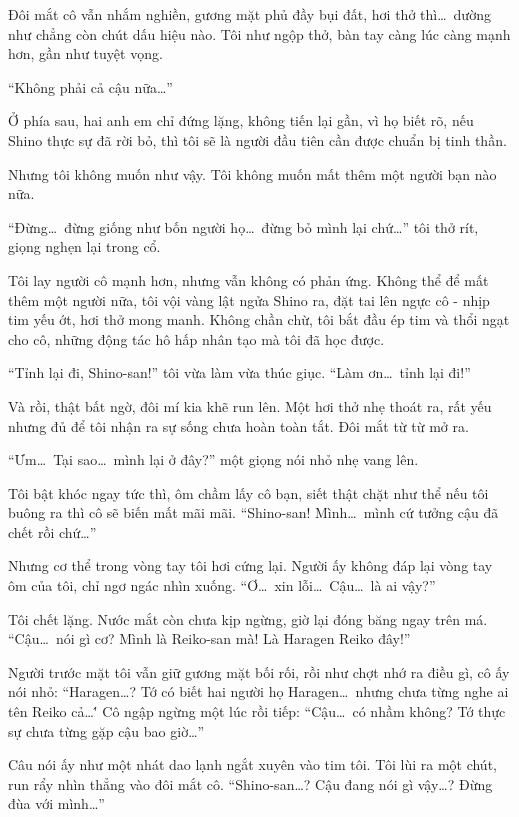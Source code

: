 \documentclass[../main.tex]{subfiles}
\begin{document}
Đôi mắt cô vẫn nhắm nghiền, gương mặt phủ đầy bụi đất, hơi thở thì\dots\ dường như chẳng còn chút dấu hiệu nào. Tôi như ngộp thở, bàn tay càng lúc càng mạnh hơn, gần như tuyệt vọng.

``Không phải cả cậu nữa\dots''

Ở phía sau, hai anh em chỉ đứng lặng, không tiến lại gần, vì họ biết rõ, nếu Shino thực sự đã rời bỏ, thì tôi sẽ là người đầu tiên cần được chuẩn bị tinh thần.

Nhưng tôi không muốn như vậy. Tôi không muốn mất thêm một người bạn nào nữa.

``Đừng\dots\ đừng giống như bốn người họ\dots\ đừng bỏ mình lại chứ\dots'' tôi thở rít, giọng nghẹn lại trong cổ.

Tôi lay người cô mạnh hơn, nhưng vẫn không có phản ứng. Không thể để mất thêm một người nữa, tôi vội vàng lật ngửa Shino ra, đặt tai lên ngực cô - nhịp tim yếu ớt, hơi thở mong manh. Không chần chừ, tôi bắt đầu ép tim và thổi ngạt cho cô, những động tác hô hấp nhân tạo mà tôi đã học được.

``Tỉnh lại đi, Shino-san!'' tôi vừa làm vừa thúc giục. ``Làm ơn\dots\ tỉnh lại đi!''

Và rồi, thật bất ngờ, đôi mí kia khẽ run lên. Một hơi thở nhẹ thoát ra, rất yếu nhưng đủ để tôi nhận ra sự sống chưa hoàn toàn tắt. Đôi mắt từ từ mở ra.

``Ưm\dots\ Tại sao\dots\ mình lại ở đây?'' một giọng nói nhỏ nhẹ vang lên.


Tôi bật khóc ngay tức thì, ôm chầm lấy cô bạn, siết thật chặt như thể nếu tôi buông ra thì cô sẽ biến mất mãi mãi. ``Shino-san! Mình\dots\ mình cứ tưởng cậu đã chết rồi chứ\dots''

Nhưng cơ thể trong vòng tay tôi hơi cứng lại. Người ấy không đáp lại vòng tay ôm của tôi, chỉ ngơ ngác nhìn xuống. ``Ơ\dots\ xin lỗi\dots\ Cậu\dots\ là ai vậy?''

Tôi chết lặng. Nước mắt còn chưa kịp ngừng, giờ lại đóng băng ngay trên má. ``Cậu\dots\ nói gì cơ? Mình là Reiko-san mà! Là Haragen Reiko đây!''

Người trước mặt tôi vẫn giữ gương mặt bối rối, rồi như chợt nhớ ra điều gì, cô ấy nói nhỏ: ``Haragen\dots? Tớ có biết hai người họ Haragen\dots\ nhưng chưa từng nghe ai tên Reiko cả\dots\'' Cô ngập ngừng một lúc rồi tiếp: ``Cậu\dots\ có nhầm không? Tớ thực sự chưa từng gặp cậu bao giờ\dots''

Câu nói ấy như một nhát dao lạnh ngắt xuyên vào tim tôi. Tôi lùi ra một chút, run rẩy nhìn thẳng vào đôi mắt cô. ``Shino-san\dots? Cậu đang nói gì vậy\dots? Đừng đùa với mình\dots''
\end{document}
